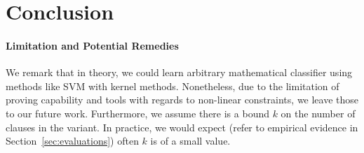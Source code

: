 
\section{Conclusion} \label{conclusion}


\paragraph{Limitation and Potential Remedies}
We remark that in theory, we could learn arbitrary mathematical classifier using methods like SVM with kernel methods\cite{yu2009evolving}. 
Nonetheless, due to the limitation of proving capability and tools with regards to non-linear constraints, we leave those to our future work. 
Furthermore, we assume there is a bound $k$ on the number of clauses in the variant. 
In practice, we would expect (refer to empirical evidence in Section~\ref{sec:evaluations}) often $k$ is of a small value.
